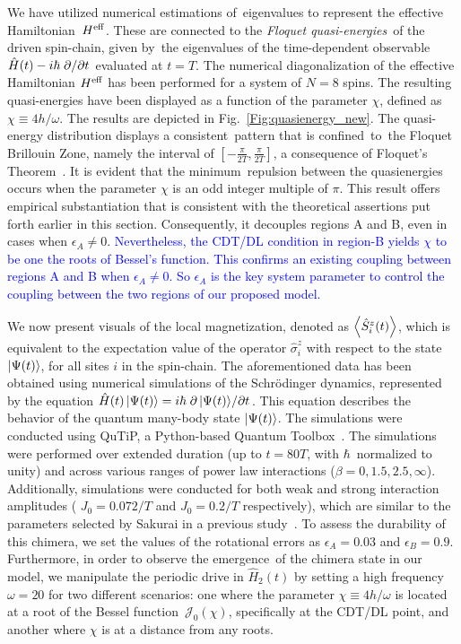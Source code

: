 \documentclass[
nofootinbib,
reprint,
superscriptaddress,
amsmath,amssymb,showkeys,
aps,
prb,
]{revtex4-2}
\newcommand{\blue}[1]{\textcolor{blue}{#1}}
\begin{document}
	We have utilized numerical estimations of eigenvalues to represent the effective Hamiltonian $H^{\rm eff}$. These are connected to the \textit{Floquet quasi-energies} of the driven spin-chain, given by the eigenvalues of the time-dependent observable $\hat{H}(t)-i\hbar\pdv*{}{t}$ evaluated at $t=T$. The numerical diagonalization of the effective Hamiltonian $H^{\rm eff}$ has been performed for a system of $N=8$ spins. The resulting quasi-energies have been displayed as a function of the parameter $\chi$, defined as $\chi\equiv 4h/\omega$. The results are depicted in Fig.~\ref{Fig:quasienergy_new}. The quasi-energy distribution displays a consistent pattern that is confined to the Floquet Brillouin Zone, namely the interval of $[-\frac{\pi}{2T}, \frac{\pi}{2T}]$, a consequence of Floquet's Theorem~\cite{dutta2014}. It is evident that the minimum repulsion between the quasienergies occurs when the parameter $\chi$ is an odd integer multiple of $\pi$. This result offers empirical substantiation that is consistent with the theoretical assertions put forth earlier in this section. Consequently, it decouples regions A and B, even in cases when $\epsilon_A \neq 0$. \blue{Nevertheless, the CDT/DL condition in region-B yields $\chi$ to be one the roots of Bessel's function. This confirms an existing coupling between regions A and B when $\epsilon_A \neq 0$. So $\epsilon_A$ is the key system parameter to control the coupling between the two regions of our proposed model.} 	
	
	We now present visuals of the local magnetization, denoted as $\expval{\hat{S}^z_i (t)}$, which is equivalent to the expectation value of the operator $\hat{\sigma}^z_i$ with respect to the state $\ket{\Psi(t)}$, for all sites $i$ in the spin-chain. The aforementioned data has been obtained using numerical simulations of the Schr\"odinger dynamics, represented by the equation $\hat{H}(t)\ket{\Psi(t)}= i \hbar \pdv*{\ket{\Psi(t)}}{t}$. This equation describes the behavior of the quantum many-body state $\ket{\Psi(t)}$. The simulations were conducted using QuTiP, a Python-based Quantum Toolbox~\cite{Johansson2013}. The simulations were performed over extended duration (up to $t = 80T$, with $\hbar$ normalized to unity) and across various ranges of power law interactions ($\beta = 0,1.5,2.5,\infty$). Additionally, simulations were conducted for both weak and strong interaction amplitudes ( $J_0 = 0.072/T$ and $J_0 = 0.2/T$ respectively), which are similar to the parameters selected by Sakurai in a previous study~\cite{sakurai_phys_nodate}. To assess the durability of this chimera, we set the values of the rotational errors as $\epsilon_A = 0.03$ and $\epsilon_B = 0.9$. Furthermore, in order to observe the emergence of the chimera state in our model, we manipulate the periodic drive in $\hat{H}_2(t)$ by setting a high frequency $\omega=20$ for two different scenarios: one where the parameter $\chi\equiv4h/\omega$ is located at a root of the Bessel function $\mathcal{J}_0(\chi)$, specifically at the CDT/DL point, and another where $\chi$ is at a distance from any roots.
	
\end{document}
